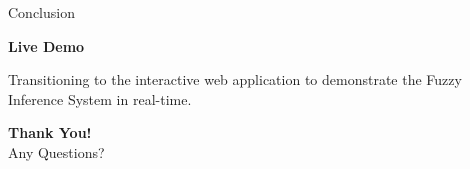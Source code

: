 \documentclass[11pt]{beamer}
\begin{document}
\begin{frame}{Conclusion}
  \begin{center}
      \Large \textbf{Live Demo}
      
      \vspace{0.5cm}
      \normalsize
      Transitioning to the interactive web application to demonstrate the Fuzzy Inference System in real-time.
      
      \vspace{1.0cm}
      \Large \textbf{Thank You!} \\
      \normalsize Any Questions?
  \end{center}
\end{frame}
\end{document}
